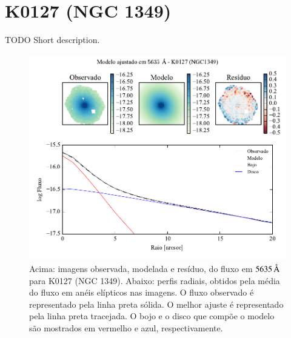 
\section{K0127 (NGC 1349)}
\label{apendice:Decomp:K0127}

TODO Short description.

\begin{figure}
	\includegraphics[page=1]{figuras-decomp/K0127_sample006a}
	\caption[Ajuste morfológico em $5635\,\angstrom$ de K0127 (NGC 1349)]
	{Acima: imagens observada, modelada e resíduo, do fluxo em $5635\,\angstrom$
	para K0127 (NGC 1349). Abaixo: perfis radiais, obtidos pela média do fluxo em
	anéis elípticos nas imagens. O fluxo observado é representado pela linha preta
	sólida. O melhor ajuste é representado pela linha preta tracejada. O bojo e o
	disco que compõe o modelo são mostrados em vermelho e azul, respectivamente.}
	\label{fig:decompRadprof:K0127}
\end{figure}


